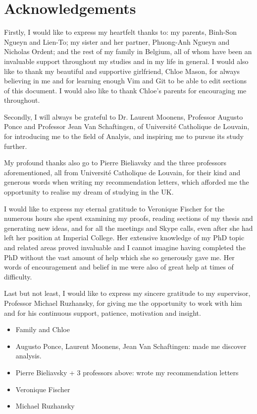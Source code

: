 \chapter*{Acknowledgements}
Firstly, I would like to express my heartfelt thanks to:
my parents, Binh-Son Ngueyn and Lien-To; my sister and her partner, Phuong-Anh Ngueyn and Nicholas Ordent; and the rest of my family in Belgium,
all of whom have been an invaluable support throughout my studies and in my life in general.
I would also like to thank my beautiful and supportive girlfriend, Chloe Mason,
for always believing in me and for learning enough Vim and Git to be able to edit sections of this document.
I would also like to thank Chloe's parents for encouraging me throughout.

Secondly, I will always be grateful to Dr. Laurent Moonens, Professor Augusto Ponce and Professor Jean Van Schaftingen,
of Universit\'e Catholique de Louvain,
for introducing me to the field of Analyis,
and inspiring me to pursue its study further.

My profound thanks also go to Pierre Bieliavsky and the three professors aforementioned,
all from Universit\'e Catholique de Louvain,
for their kind and generous words when writing my recommendation letters,
which afforded me the opportunity to realise my dream of studying in the UK.

I would like to express my eternal gratitude to Veronique Fischer for the numerous hours she spent examining my proofs,
reading sections of my thesis and generating new ideas,
and for all the meetings and Skype calls,
even after she had left her position at Imperial College.
Her extensive knowledge of my PhD topic and related areas proved invaluable and I cannot imagine having completed the PhD without the vast amount of help which she so generously gave me.
Her words of encouragement and belief in me were also of great help at times of difficulty.

Last but not least,
I would like to express my sincere gratitude to my supervisor,
Professor Michael Ruzhansky,
for giving me the opportunity to work with him and for his continuous support, patience, motivation and insight.

\begin{itemize}
    \item Family and Chloe
    \item Augusto Ponce, Laurent Moonens, Jean Van Schaftingen: made me discover analysis.
    \item Pierre Bieliavsky + 3 professors above: wrote my recommendation letters
    \item Veronique Fischer
    \item Michael Ruzhansky
\end{itemize}
